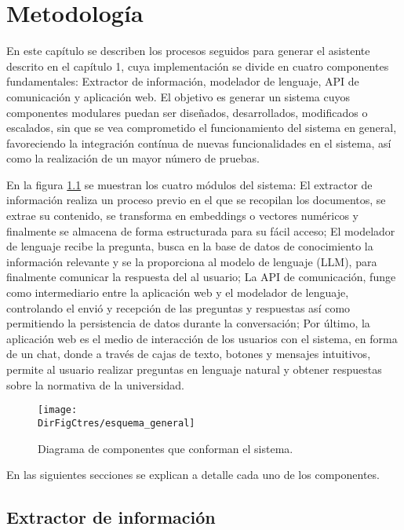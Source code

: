 \chapter{Metodología}

En este capítulo se describen los procesos seguidos para generar el asistente descrito en
el capítulo 1, cuya implementación se divide en cuatro componentes fundamentales:
Extractor de información, modelador de lenguaje, API de comunicación y aplicación web. El
objetivo es generar un sistema cuyos componentes modulares puedan ser diseñados, desarrollados,
modificados o escalados, sin que se vea comprometido el funcionamiento del sistema en general,
favoreciendo la integración contínua de nuevas funcionalidades en el sistema, así como la
realización de un mayor número de pruebas.

En la figura \ref{fig:esquema_general} se muestran los cuatro módulos del sistema: El extractor
de información realiza un proceso previo en el que se recopilan los documentos, se extrae su
contenido, se transforma en embeddings o vectores numéricos y finalmente se almacena de forma
estructurada para su fácil acceso; El modelador de lenguaje recibe la pregunta, busca en
la base de datos de conocimiento la información relevante y se la proporciona al modelo de
lenguaje (LLM), para finalmente comunicar la respuesta del al usuario; La API de
comunicación, funge como intermediario entre la aplicación web y el modelador de lenguaje,
controlando el envió y recepción de las preguntas y respuestas así como permitiendo la
persistencia de datos durante la conversación; Por último, la aplicación web es el medio de interacción
de los usuarios con el sistema, en forma de un chat, donde a través de cajas de texto, botones
y mensajes intuitivos, permite al usuario realizar preguntas en lenguaje natural y obtener
respuestas sobre la normativa de la universidad.

\begin{figure}[]
    \centering
    \texttt{[image: \\DirFigCtres/esquema\_general]}
    \caption{Diagrama de componentes que conforman el sistema.}
    \label{fig:esquema_general}
\end{figure}

En las siguientes secciones se explican a detalle cada uno de los componentes.

\section{Extractor de información}

